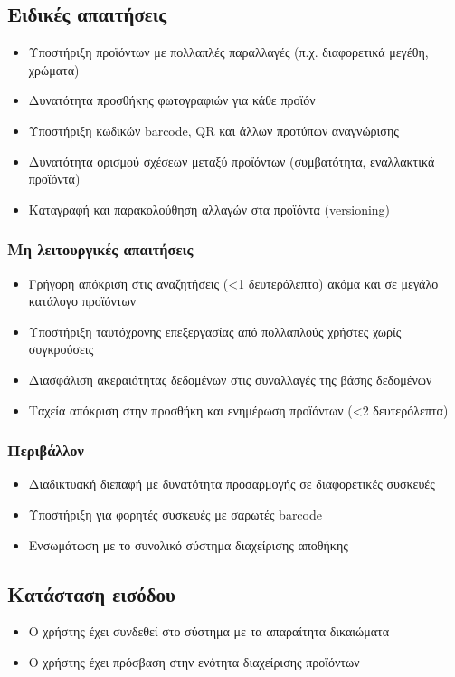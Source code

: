 \documentclass[12pt,a4paper,twoside]{book}
\begin{document}
\subsection{Ειδικές απαιτήσεις}
\begin{itemize}
  \item Υποστήριξη προϊόντων με πολλαπλές παραλλαγές (π.χ. διαφορετικά μεγέθη, χρώματα)
  \item Δυνατότητα προσθήκης φωτογραφιών για κάθε προϊόν
  \item Υποστήριξη κωδικών barcode, QR και άλλων προτύπων αναγνώρισης
  \item Δυνατότητα ορισμού σχέσεων μεταξύ προϊόντων (συμβατότητα, εναλλακτικά προϊόντα)
  \item Καταγραφή και παρακολούθηση αλλαγών στα προϊόντα (versioning)
\end{itemize}

\subsubsection{Μη λειτουργικές απαιτήσεις}
\begin{itemize}
  \item Γρήγορη απόκριση στις αναζητήσεις (<1 δευτερόλεπτο) ακόμα και σε μεγάλο κατάλογο προϊόντων
  \item Υποστήριξη ταυτόχρονης επεξεργασίας από πολλαπλούς χρήστες χωρίς συγκρούσεις
  \item Διασφάλιση ακεραιότητας δεδομένων στις συναλλαγές της βάσης δεδομένων
  \item Ταχεία απόκριση στην προσθήκη και ενημέρωση προϊόντων (<2 δευτερόλεπτα)
\end{itemize}

\subsubsection{Περιβάλλον}
\begin{itemize}
  \item Διαδικτυακή διεπαφή με δυνατότητα προσαρμογής σε διαφορετικές συσκευές
  \item Υποστήριξη για φορητές συσκευές με σαρωτές barcode
  \item Ενσωμάτωση με το συνολικό σύστημα διαχείρισης αποθήκης
\end{itemize}

\subsection{Κατάσταση εισόδου}
\begin{itemize}
  \item Ο χρήστης έχει συνδεθεί στο σύστημα με τα απαραίτητα δικαιώματα
  \item Ο χρήστης έχει πρόσβαση στην ενότητα διαχείρισης προϊόντων
\end{itemize}
\end{document}
